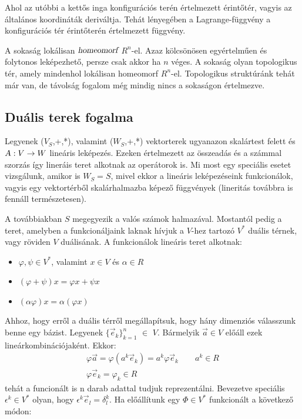 \documentclass[a4paper, 12pt]{article}
\begin{document}
\par Ahol az utóbbi a kettős inga konfigurációs terén értelmezett érintőtér, vagyis az általános koordináták deriváltja. Tehát lényegében a Lagrange-függvény a konfigurációs tér érintőterén értelmezett függvény.
\newline
\par A sokaság lokálisan $\textsl{homeomorf}$ $R^{n}$-el. Azaz kölcsönösen egyértelműen és folytonos leképezhető, persze csak akkor ha $n$ véges. A sokaság olyan topologikus tér, amely mindenhol lokálisan homeomorf $R^{n}$-el. Topologikus struktúránk tehát már van, de távolság fogalom még mindig nincs a sokaságon értelmezve.
\subsection{Duális terek fogalma}
\par Legyenek ($V_S$,+,*), valamint ($W_S$,+,*) vektorterek ugyanazon skalártest felett és $\textsl{A} : V \rightarrow W$ lineáris leképezés. Ezeken értelmezett az összeadás és a számmal szorzás így lineráis teret alkotnak az operátorok is.  Mi most egy speciális esetet vizsgálunk, amikor is $W_S = S$, mivel ekkor a lineáris leképezéseink funkcionálok, vagyis egy vektortérből skalárhalmazba képező függvények (lineritás továbbra is fennáll természetesen).
\par A továbbiakban $S$ megegyezik a valós számok halmazával. Mostantól pedig a teret, amelyben a funkcionáljaink laknak hívjuk a $V$-hez tartozó $V^{*}$ duális térnek, vagy röviden $V$ duálisának. A funkcionálok lineáris teret alkotnak:
\begin{itemize}
\item $\varphi, \psi \in V^{*}$, valamint $x \in V$ és $\alpha \in R$
\item $(\varphi + \psi)x = \varphi x + \psi x$
\item $(\alpha \varphi)x = \alpha (\varphi x)$
\end{itemize}
\par Ahhoz, hogy erről a duális térről megállapítsuk, hogy hány dimenziós válasszunk benne egy bázist. Legyenek $\{\vec{e}_{k}\}_{k = 1}^{n}$ $\in$ $V$. Bármelyik $\vec{a} \in V$ előáll ezek lineárkombinációjaként. Ekkor:
\begin{align*}
\varphi\vec{a} = \varphi(a^{k}\vec{e}_{k}) = a^{k}\varphi\vec{e}_{k} \quad  \quad a^{k} \in R \\
\varphi\vec{e}_{k} = \varphi_{k} \in R
\end{align*}
tehát a funcionált is n darab adattal tudjuk reprezentálni. Bevezetve speciális $\epsilon^{k} \in V^{*}$ olyan, hogy $\epsilon^{k}\vec{e}_{l} = \delta_{l}^{k}$. Ha előállítunk egy $\Phi \in V^{*}$ funkcionált a következő módon:
\end{document}
